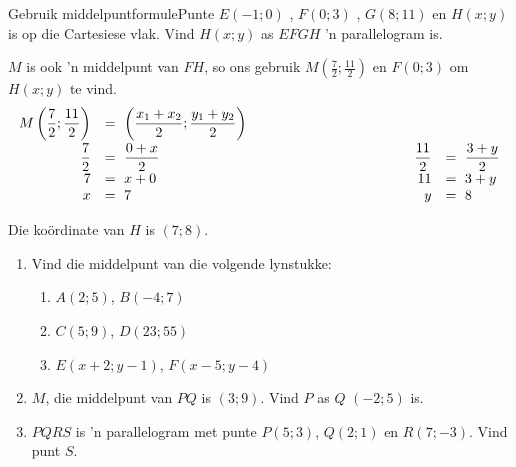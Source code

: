 \begin{wex}{Gebruik middelpuntformule}{Punte $E(-1;0)$ , $F(0;3)$ , $G(8;11)$ en $H(x;y)$ is op die Cartesiese vlak. Vind $H(x;y)$ as $EFGH$ 'n parallelogram is.}
{
$M$ is ook 'n middelpunt van $FH$, so ons gebruik $M(\frac{7}{2};\frac{11}{2})$ en $F(0;3)$ om $H(x;y)$ te vind.
\begin{equation*}
\begin{array}{rllrl}
 M\left(\dfrac{7}{2};\dfrac{11}{2}\right) &=~\left(\dfrac{x_1+x_2}{2}; \dfrac{y_1+y_2}{2}\right)\\[8pt]
\dfrac{7}{2}&=~\dfrac{0+x}{2}&\hskip10em&\dfrac{11}{2}&=~\dfrac{3+y}{2}\\
7&=~x+0&&11&=~3+y\\
x&=~7&&y&=~8\\
\end{array}
\end{equation*}

Die ko\"ordinate van $H$ is $(7;8)$.
}
\end{wex}
\begin{exercises}{}
\begin{enumerate}[itemsep=5pt, label=\textbf{\arabic*}. ]
\item Vind die middelpunt van die volgende lynstukke:
  \begin{enumerate}[noitemsep, label=\textbf{(\alph*)} ]
\item $A(2;5)$, $B(-4;7)$
\item $C(5;9)$, $D(23;55)$
\item $E(x+2;y-1)$, $F(x-5;y-4)$
\end{enumerate}

\item $M$, die middelpunt van $PQ$ is $(3;9)$. Vind $P$ as $Q$  $(-2;5)$ is.
\item $PQRS$ is 'n parallelogram met punte $P(5;3)$, $Q(2;1)$ en $R(7;-3)$. Vind punt $S$.

\end{enumerate}
\end{exercises}    

